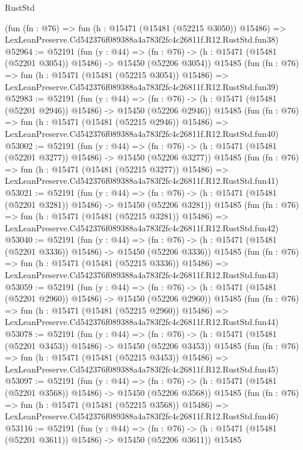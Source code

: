 \begin{lexlean}{RustStd}
\begin{coremodule}
    (fun (fn : @76) =>
    fun (h : @15471 (@15481 (@52215 @3050)) @15486) =>
    LexLeanPreserve.Cd542376f089388a4a783f2fc4c26811f.R12.RustStd.fun38)
@52964 := @52191
    (fun (y : @44) =>
    (fn : @76) -> (h : @15471 (@15481 (@52201 @3054)) @15486) -> @15450 (@52206 @3054))
    @15485
    (fun (fn : @76) =>
    fun (h : @15471 (@15481 (@52215 @3054)) @15486) =>
    LexLeanPreserve.Cd542376f089388a4a783f2fc4c26811f.R12.RustStd.fun39)
@52983 := @52191
    (fun (y : @44) =>
    (fn : @76) -> (h : @15471 (@15481 (@52201 @2946)) @15486) -> @15450 (@52206 @2946))
    @15485
    (fun (fn : @76) =>
    fun (h : @15471 (@15481 (@52215 @2946)) @15486) =>
    LexLeanPreserve.Cd542376f089388a4a783f2fc4c26811f.R12.RustStd.fun40)
@53002 := @52191
    (fun (y : @44) =>
    (fn : @76) -> (h : @15471 (@15481 (@52201 @3277)) @15486) -> @15450 (@52206 @3277))
    @15485
    (fun (fn : @76) =>
    fun (h : @15471 (@15481 (@52215 @3277)) @15486) =>
    LexLeanPreserve.Cd542376f089388a4a783f2fc4c26811f.R12.RustStd.fun41)
@53021 := @52191
    (fun (y : @44) =>
    (fn : @76) -> (h : @15471 (@15481 (@52201 @3281)) @15486) -> @15450 (@52206 @3281))
    @15485
    (fun (fn : @76) =>
    fun (h : @15471 (@15481 (@52215 @3281)) @15486) =>
    LexLeanPreserve.Cd542376f089388a4a783f2fc4c26811f.R12.RustStd.fun42)
@53040 := @52191
    (fun (y : @44) =>
    (fn : @76) -> (h : @15471 (@15481 (@52201 @3336)) @15486) -> @15450 (@52206 @3336))
    @15485
    (fun (fn : @76) =>
    fun (h : @15471 (@15481 (@52215 @3336)) @15486) =>
    LexLeanPreserve.Cd542376f089388a4a783f2fc4c26811f.R12.RustStd.fun43)
@53059 := @52191
    (fun (y : @44) =>
    (fn : @76) -> (h : @15471 (@15481 (@52201 @2960)) @15486) -> @15450 (@52206 @2960))
    @15485
    (fun (fn : @76) =>
    fun (h : @15471 (@15481 (@52215 @2960)) @15486) =>
    LexLeanPreserve.Cd542376f089388a4a783f2fc4c26811f.R12.RustStd.fun44)
@53078 := @52191
    (fun (y : @44) =>
    (fn : @76) -> (h : @15471 (@15481 (@52201 @3453)) @15486) -> @15450 (@52206 @3453))
    @15485
    (fun (fn : @76) =>
    fun (h : @15471 (@15481 (@52215 @3453)) @15486) =>
    LexLeanPreserve.Cd542376f089388a4a783f2fc4c26811f.R12.RustStd.fun45)
@53097 := @52191
    (fun (y : @44) =>
    (fn : @76) -> (h : @15471 (@15481 (@52201 @3568)) @15486) -> @15450 (@52206 @3568))
    @15485
    (fun (fn : @76) =>
    fun (h : @15471 (@15481 (@52215 @3568)) @15486) =>
    LexLeanPreserve.Cd542376f089388a4a783f2fc4c26811f.R12.RustStd.fun46)
@53116 := @52191
    (fun (y : @44) =>
    (fn : @76) -> (h : @15471 (@15481 (@52201 @3611)) @15486) -> @15450 (@52206 @3611))
    @15485

\end{coremodule}
\end{lexlean}

